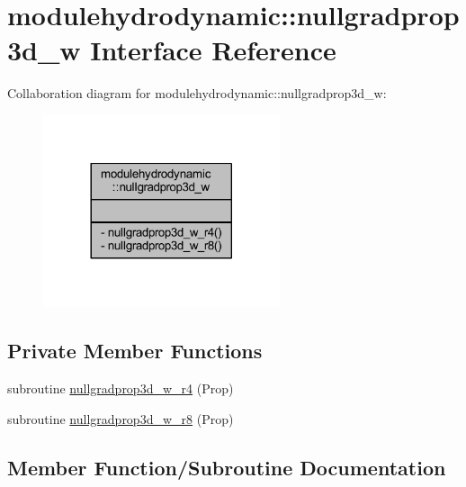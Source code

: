\hypertarget{interfacemodulehydrodynamic_1_1nullgradprop3d__w}{}\section{modulehydrodynamic\+:\+:nullgradprop3d\+\_\+w Interface Reference}
\label{interfacemodulehydrodynamic_1_1nullgradprop3d__w}


Collaboration diagram for modulehydrodynamic\+:\+:nullgradprop3d\+\_\+w\+:\nopagebreak
\begin{figure}[H]
\begin{center}
\leavevmode
\includegraphics[width=197pt]{interfacemodulehydrodynamic_1_1nullgradprop3d__w__coll__graph}
\end{center}
\end{figure}
\subsection*{Private Member Functions}
\begin{DoxyCompactItemize}
\item 
subroutine \mbox{\hyperlink{interfacemodulehydrodynamic_1_1nullgradprop3d__w_ad4c9ee708870ba2a46b2ac529a10e5cf}{nullgradprop3d\+\_\+w\+\_\+r4}} (Prop)
\item 
subroutine \mbox{\hyperlink{interfacemodulehydrodynamic_1_1nullgradprop3d__w_a11458bd663d5d4cc24439925f048c565}{nullgradprop3d\+\_\+w\+\_\+r8}} (Prop)
\end{DoxyCompactItemize}


\subsection{Member Function/\+Subroutine Documentation}
\mbox{\label{interfacemodulehydrodynamic_1_1nullgradprop3d__w_ad4c9ee708870ba2a46b2ac529a10e5cf}} 
